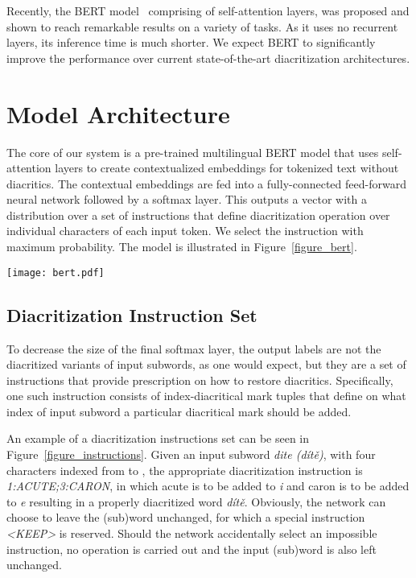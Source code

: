 \documentclass{pbmlarxiv}
\begin{document}
Recently, the BERT model~\cite{devlin2018bert} comprising of self-attention layers, was proposed and shown to reach remarkable results on a variety of tasks. As it uses no recurrent layers, its inference time is much shorter. 
We expect BERT to significantly improve the performance over current state-of-the-art diacritization architectures.


\section{Model Architecture}

The core of our system is a pre-trained multilingual BERT model that uses self-attention layers to create contextualized embeddings for tokenized text without diacritics. The contextual embeddings are fed into a fully-connected feed-forward neural network followed by a softmax layer. This outputs a vector with a distribution over a set of instructions that define diacritization operation over individual characters of each input token. We select the instruction with maximum probability. The model is illustrated in Figure~\ref{figure_bert}.

\begin{figure*}
    \centering
    \texttt{[image: bert.pdf]}    
    \caption{Model architecture. Text without diacritics, tokenized into subwords, is fed to BERT and for each of its outputs, fully-connected network followed by softmax is applied to obtain the most probable instruction for diacritization. \#\#-prefixes of some subwords are added by the BERT tokenizer.}
    \label{figure_bert}
\end{figure*}

\subsection{Diacritization Instruction Set}

To decrease the size of the final softmax layer, the output labels are not the diacritized variants of input subwords, as one would expect, but they are a set of instructions that provide prescription on how to restore diacritics. Specifically, one such instruction consists of index-diacritical mark tuples that define on what index of input subword a particular diacritical mark should be added.

An example of a diacritization instructions set can be seen in Figure~\ref{figure_instructions}. Given an input subword \textit{dite (dítě)}, with four characters indexed from  to , the appropriate diacritization instruction is \textit{1:ACUTE;3:CARON}, in which acute is to be added to \textit{i} and caron is to be added to \textit{e} resulting in a properly diacritized word \textit{dítě}. Obviously, the network can choose to leave the (sub)word unchanged, for which a special instruction \textit{<KEEP>} is reserved. Should the network accidentally select an impossible instruction, no operation is carried out and the input (sub)word is also left unchanged.
\end{document}
